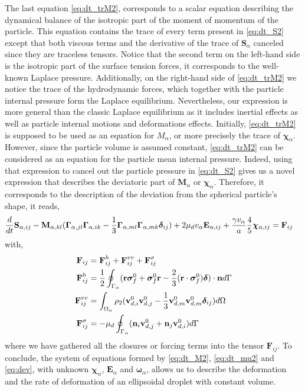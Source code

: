 The last equation \eqref{eq:dt_trM2}, corresponds to a scalar equation describing the dynamical balance of the isotropic part of the moment of momentum of the particle. 
This equation contains the trace of every term present in \ref{eq:dt_S2} except that both viscous terms and the derivative of the trace of $\textbf{S}_\alpha$ canceled since they are traceless tensors. 
Notice that the second term on the left-hand side is the isotropic part of the surface tension forces, it corresponds to the well-known Laplace pressure. 
Additionally, on the right-hand side of \ref{eq:dt_trM2} we notice the trace of the hydrodynamic forces, which together with the particle internal pressure form the Laplace equilibrium. 
Nevertheless, our expression is more general than the classic Laplace equilibrium as it includes inertial effects as well as particle internal motions and deformations effects.  
Initially, \ref{eq:dt_trM2} is supposed to be used as an equation for $M_\alpha$, or more precisely the trace of $\bm\chi_\alpha$.
However, since the particle volume is assumed constant, \ref{eq:dt_trM2} can be considered as an equation for the particle mean internal pressure. 
Indeed, using that expression to cancel out the particle pressure in \ref{eq:dt_S2} gives us a novel expression that describes the deviatoric part of $\textbf{M}_\alpha$ or $\bm\chi_\alpha$.
Therefore, it corresponds to the description of the deviation from the spherical particle's shape, it reads, 
\begin{align}
    \ddt \textbf{S}_{\alpha,ij}
    -   \textbf{M}_{\alpha,kl} 
    (\bm\Gamma_{\alpha,jl}\bm\Gamma_{\alpha,ik}  
    - \frac{1}{3}
    \bm\Gamma_{\alpha,ml}\bm\Gamma_{\alpha,mk}  
    \bm\delta_{ij}
    )
    &+ 2 \mu_d v_\alpha \textbf{E}_{\alpha,ij}
    + \frac{\gamma v_\alpha }{a} 
    \frac{4  }{5} \bm\chi_{\alpha,ij}
    = \textbf{F}_{ij}
    \label{eq:dev}
\end{align}
with,
\begin{align}
    \textbf{F}_{ij}
    &= 
    \textbf{F}_{ij}^h
    +\textbf{F}_{ij}^{vv}
    + \textbf{F}_{ij}^{\sigma}\\
    \textbf{F}_{ij}^h
    &= \frac{1}{2}\oint_{\Gamma_{\alpha}} (\textbf{r}\bm\sigma_f^0 + \bm\sigma_f^0\textbf{r} - \frac{2}{3}(\textbf{r}\cdot \bm\sigma_f^0) \bm\delta)\cdot \textbf{n} d\Gamma \\
    \textbf{F}_{ij}^{vv}
    &= \int_{\Omega_{\alpha}} \rho_2 (\textbf{v}_{d,i}^0\textbf{v}_{d,j}^0 - \frac{1}{3}\textbf{v}_{d,m}^0\textbf{v}_{d,m}^0 \bm\delta_{ij})  d\Omega\\
    \textbf{F}_{ij}^{\sigma}
    &= - \mu_d \oint_{\Gamma_{\alpha}} (\textbf{n}_i \textbf{v}_{d,j}^0 + \textbf{n}_j \textbf{v}_{d,i}^0) d\Gamma\nonumber
\end{align}
where we have gathered all the closures or forcing terms into the tensor $\textbf{F}_{ij}$. 
To conclude, the system of equations formed by \ref{eq:dt_M2}, \ref{eq:dt_mu2} and \ref{eq:dev}, with unknown $\bm\chi_\alpha$, $\textbf{E}_\alpha$ and $\bm\omega_\alpha$, allows us to describe the deformation and the rate of deformation of an ellipsoidal droplet with constant volume.

